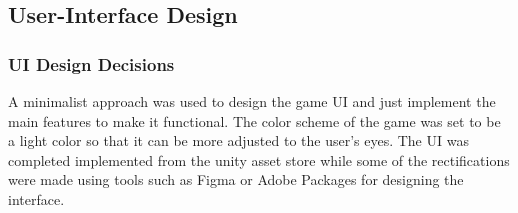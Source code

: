 \subsection{User-Interface Design}
\subsubsection{UI Design Decisions}
A minimalist approach was used to design the game UI and just implement the main features to make it functional. The color scheme of the game was set to be a light color so that it can be more adjusted to the user's eyes. The UI was completed implemented from the unity asset store while some of the rectifications were made using tools such as Figma or Adobe Packages for designing the interface.


